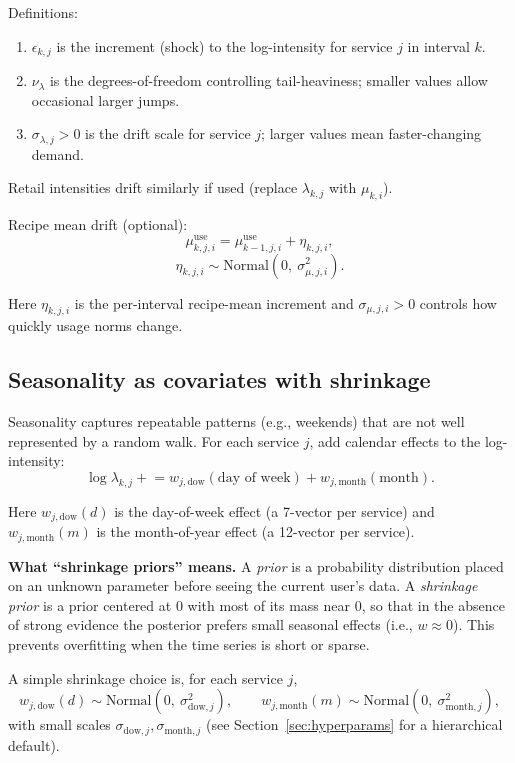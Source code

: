 \documentclass[11pt]{article}
\begin{document}
Definitions:
\begin{enumerate}
  \item $\epsilon_{k,j}$ is the increment (shock) to the log-intensity for service $j$ in interval $k$.
  \item $\nu_{\lambda}$ is the degrees-of-freedom controlling tail-heaviness; smaller values allow occasional larger jumps.
  \item $\sigma_{\lambda,j}>0$ is the drift scale for service $j$; larger values mean faster-changing demand.
\end{enumerate}

Retail intensities drift similarly if used (replace $\lambda_{k,j}$ with $\mu_{k,i}$).

Recipe mean drift (optional):
\[
  \mu^{\mathrm{use}}_{k,j,i} = \mu^{\mathrm{use}}_{k-1,j,i} + \eta_{k,j,i},
\]
\[
  \eta_{k,j,i} \sim \text{Normal}(0,\ \sigma^2_{\mu,j,i}).
\]

Here $\eta_{k,j,i}$ is the per-interval recipe-mean increment and $\sigma_{\mu,j,i}>0$ controls how quickly usage norms change.

\subsection{Seasonality as covariates with shrinkage}

Seasonality captures repeatable patterns (e.g., weekends) that are not well represented by a random walk.
For each service $j$, add calendar effects to the log-intensity:
\[
  \log \lambda_{k,j} \mathrel{+}= w_{j,\text{dow}}(\text{day of week}) + w_{j,\text{month}}(\text{month}).
\]

Here $w_{j,\text{dow}}(d)$ is the day-of-week effect (a 7-vector per service) and $w_{j,\text{month}}(m)$ is the month-of-year effect (a 12-vector per service).

\textbf{What ``shrinkage priors'' means.} A \emph{prior} is a probability distribution placed on an unknown parameter before seeing the current user's data.
A \emph{shrinkage prior} is a prior centered at 0 with most of its mass near 0, so that in the absence of strong evidence the posterior prefers small seasonal effects (i.e., $w\approx 0$).
This prevents overfitting when the time series is short or sparse.

A simple shrinkage choice is, for each service $j$,
\[
  w_{j,\text{dow}}(d) \sim \text{Normal}(0,\ \sigma^2_{\text{dow},j}),\qquad
  w_{j,\text{month}}(m) \sim \text{Normal}(0,\ \sigma^2_{\text{month},j}),
\]
with small scales $\sigma_{\text{dow},j},\sigma_{\text{month},j}$ (see Section~\ref{sec:hyperparams} for a hierarchical default).
\end{document}
